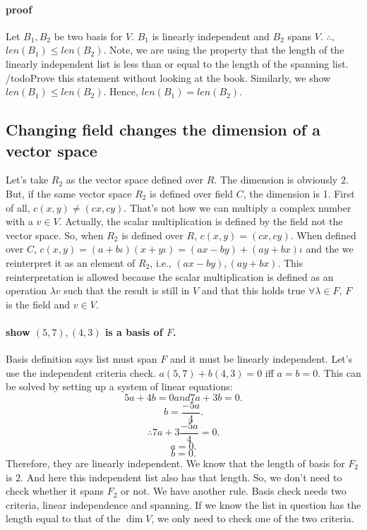 \documentclass{report}
\begin{document}
\paragraph{proof} 

Let $B_1,B_2$ be two basis for $V$. $B_1$ is linearly independent and $B_2$ spans $V$. $\therefore$, $len(B_1) \leq len(B_2)$. Note, we are using the property that the length of the linearly independent list is less than or equal to the length of the spanning list. /todo{Prove this statement without looking at the book}. Similarly, we show $len(B_1) \leq len(B_2)$. Hence, $len(B_1) = len(B_2)$. 


\subsection{Changing field changes the dimension of a vector space}
Let's take $R_2$ as the vector space defined over $R$. The dimension is obviously $2$. But, if the same vector space $R_2$ is defined over field $C$, the dimension is 1. First of all, $c(x,y) \neq (cx,cy)$. That's not how we can multiply a complex number with a $v \in V$. Actually, the scalar multiplication is defined by the field not the vector space. So, when $R_2$ is defined over $R$, $c(x,y) = (cx,cy)$. When defined over $C$, $c(x,y) = (a+b\iota) (x + y\iota) = (ax-by) + (ay+bx)\iota$ and the we reinterpret it as an element of $R_2$, i.e., $(ax-by),(ay+bx)$. This reinterpretation is allowed because the scalar multiplication is defined as an operation $\lambda v$ such that the result is still in  $V$ and that this holds true $\forall \lambda \in F$, $F$ is the field and  $v \in V$.

\paragraph{show $(5,7),(4,3)$ is a basis of $F$.} 

Basis definition says list must span $F$ and it must be linearly independent. Let's use the independent criteria check. $a(5,7) + b(4,3) = 0$ iff $a = b = 0$. This can be solved by setting up a system of linear equations:
\[
5a + 4b = 0 and 7a + 3b = 0 
.\] 
\[
b = \frac{-5a}{4}
.\] 
\[
\therefore 7a + 3\frac{-5a}{4} = 0 
.\] 
\[
a = 0 
.\] 
\[
b = 0 
.\] 
Therefore, they are linearly independent. We know that the length of basis for $F_2$ is $2$. And here this independent list also has that length. So, we don't need to check whether it spans $F_2$ or not. We have another rule. Basis check needs two criteria, linear independence and spanning. If we know the list in question has the length equal to that of the $\dim V$, we only need to check one of the two criteria. 
\end{document}
